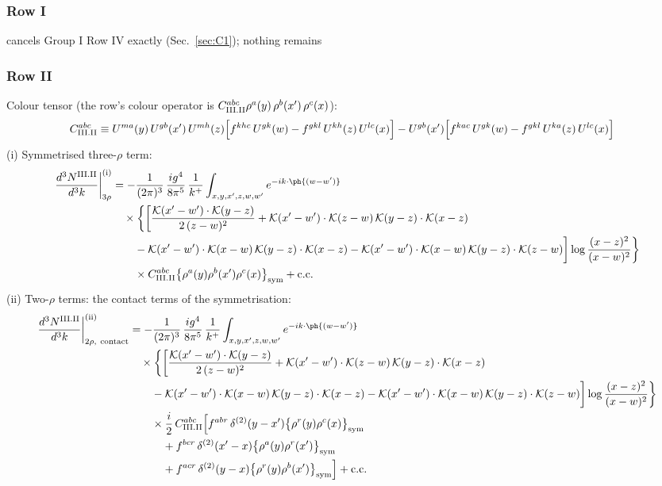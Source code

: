 \subsubsection*{Row I}
cancels Group I Row IV exactly (Sec.~\ref{sec:C1}); nothing remains
\subsubsection*{Row II}
Colour tensor (the row's colour operator is $C^{abc}_{{\rm III.II}}\rho^{a}(y)\,\rho^{b}(x')\,\rho^{c}(x)$):
\begin{align}
C^{abc}_{{\rm III.II}}&\equiv U^{ma}(y)\,U^{gb}(x')\,U^{mh}(z)\Big[f^{khc}\,U^{gk}(w)-f^{gkl}\,U^{kh}(z)\,U^{lc}(x)\Big]-U^{gb}(x')\Big[f^{kac}\,U^{gk}(w)-f^{gkl}\,U^{ka}(z)\,U^{lc}(x)\Big]\notag
\end{align}
(i) Symmetrised three-$\rho$ term:
\begin{align}
\frac{d^{3}N^{\rm III.II}}{d^{3}k}\bigg|^{\rm (i)}_{3\rho}&=-\frac{1}{(2\pi)^{3}}\,\frac{ig^{4}}{8\pi^{5}}\,\frac{1}{k^{+}}\int_{x,y,x',z,w,w'}e^{-ik\cdot\ph{(w-w')}}\notag\\
&\quad\times\bigg\{\bigg[\frac{\mathcal{K}(x'-w')\cdot\mathcal{K}(y-z)}{2\,(z-w)^{2}}+\mathcal{K}(x'-w')\cdot\mathcal{K}(z-w)\,\mathcal{K}(y-z)\cdot\mathcal{K}(x-z)\notag\\
&\qquad-\mathcal{K}(x'-w')\cdot\mathcal{K}(x-w)\,\mathcal{K}(y-z)\cdot\mathcal{K}(x-z)-\mathcal{K}(x'-w')\cdot\mathcal{K}(x-w)\,\mathcal{K}(y-z)\cdot\mathcal{K}(z-w)\bigg]\log\frac{(x-z)^{2}}{(x-w)^{2}}\bigg\}\notag\\
&\qquad\times C^{abc}_{{\rm III.II}}\big\{\rho^{a}(y)\rho^{b}(x')\rho^{c}(x)\big\}_{\rm sym}+{\rm c.c.}\label{eq:D-III.II-3}
\end{align}
(ii) Two-$\rho$ terms: the contact terms of the symmetrisation:
\begin{align}
\frac{d^{3}N^{\rm III.II}}{d^{3}k}\bigg|^{\rm (ii)}_{2\rho,\ {\rm contact}}&=-\frac{1}{(2\pi)^{3}}\,\frac{ig^{4}}{8\pi^{5}}\,\frac{1}{k^{+}}\int_{x,y,x',z,w,w'}e^{-ik\cdot\ph{(w-w')}}\notag\\
&\quad\times\bigg\{\bigg[\frac{\mathcal{K}(x'-w')\cdot\mathcal{K}(y-z)}{2\,(z-w)^{2}}+\mathcal{K}(x'-w')\cdot\mathcal{K}(z-w)\,\mathcal{K}(y-z)\cdot\mathcal{K}(x-z)\notag\\
&\qquad-\mathcal{K}(x'-w')\cdot\mathcal{K}(x-w)\,\mathcal{K}(y-z)\cdot\mathcal{K}(x-z)-\mathcal{K}(x'-w')\cdot\mathcal{K}(x-w)\,\mathcal{K}(y-z)\cdot\mathcal{K}(z-w)\bigg]\log\frac{(x-z)^{2}}{(x-w)^{2}}\bigg\}\notag\\
&\qquad\times \frac{i}{2}\,C^{abc}_{{\rm III.II}}\Big[f^{abr}\,\delta^{(2)}(y-x')\big\{\rho^{r}(y)\rho^{c}(x)\big\}_{\rm sym}\notag\\
&\qquad\quad +f^{bcr}\,\delta^{(2)}(x'-x)\big\{\rho^{a}(y)\rho^{r}(x')\big\}_{\rm sym}\notag\\
&\qquad\quad +f^{acr}\,\delta^{(2)}(y-x)\big\{\rho^{r}(y)\rho^{b}(x')\big\}_{\rm sym}\Big]+{\rm c.c.}\label{eq:D-III.II-2}
\end{align}
